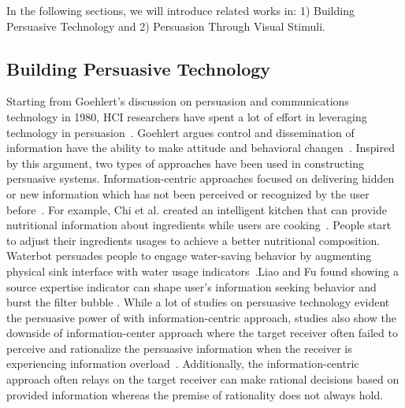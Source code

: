 
In the following sections, we will introduce related works in: 1) Building Persuasive Technology and 2) Persuasion Through Visual Stimuli.

\subsection{Building Persuasive Technology}
Starting from Goehlert's discussion on persuasion and communications technology in 1980, HCI researchers have spent a lot of effort in leveraging technology in persuasion~\cite{goehlert1980information}. Goehlert argues control and dissemination of information have the ability to make attitude and behavioral changen~\cite{goehlert1980information}. Inspired by this argument, two types of approaches have been used in constructing persuasive systems. Information-centric approaches focused on delivering hidden or new information which has not been perceived or recognized by the user before~\cite{LeeKF11}. For example, Chi et al. created an intelligent kitchen that can provide nutritional information about ingredients while users are cooking~\cite{chi2007enabling}. People start to adjust their ingredients usages to achieve a better nutritional composition. Waterbot persuades people to engage water-saving behavior by augmenting physical sink interface with water usage indicators~\cite{arroyo2005waterbot}.Liao and Fu found showing a source expertise indicator can shape user's information seeking behavior and burst the filter bubble \cite{liao2014expert}. While a lot of studies on persuasive technology evident the persuasive power of with information-centric approach, studies also show the downside of information-center approach where the target receiver often failed to perceive and rationalize the persuasive information when the receiver is experiencing information overload~\cite{goehlert1980information,LeeKF11}. Additionally, the information-centric approach often relays on the target receiver can make rational decisions based on provided information whereas the premise of rationality does not always hold.

